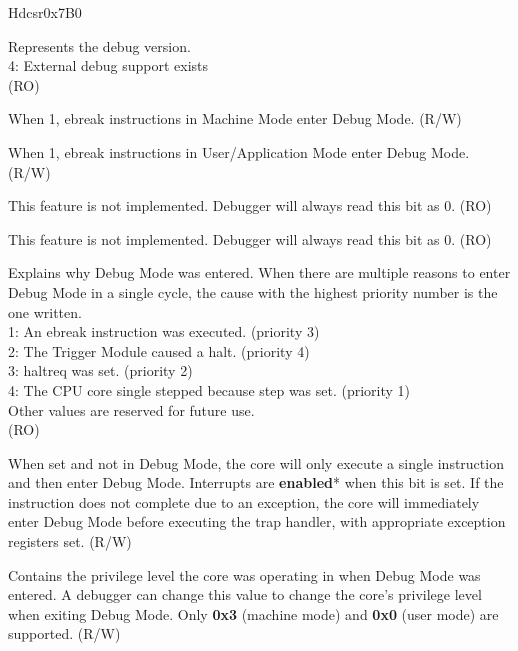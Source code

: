 
\begin{register}{H}{dcsr}{0x7B0}
\label{regdesc:DCSR}
%
%
%
%
%
%
%
%
%
%
%
%
\regnewline%
\begin{regdesc}
\begin{reglist}
\label{fielddesc:DCSRXEDBGVER}\item [xdebugver] Represents the debug version. \\
4: External debug support exists\\
(RO)
\label{fielddesc:DCSREBREAKM}\item [ebreakm] When 1, ebreak instructions in Machine Mode enter Debug Mode. (R/W)
\label{fielddesc:DCSREBREAKU}\item [ebreaku] When 1, ebreak instructions in User/Application Mode enter Debug Mode. (R/W)
\label{fielddesc:DCSRSTOPCOUNT}\item [stopcount] This feature is not implemented. Debugger will always read this bit as 0. (RO)
\label{fielddesc:DCSRSTOPTIME}\item [stoptime] This feature is not implemented. Debugger will always read this bit as 0. (RO)
\label{fielddesc:DCSRCAUSE}\item [cause] Explains why Debug Mode was entered. When there are multiple reasons to enter Debug Mode in a single cycle, the cause with the highest priority number is the one written.\\
1: An ebreak instruction was executed. (priority 3)\\
2: The Trigger Module caused a halt. (priority 4)\\
3: haltreq was set. (priority 2)\\
4: The CPU core single stepped because step was set. (priority 1)\\
Other values are reserved for future use.\\
(RO)
\label{fielddesc:DCSRSTEP}\item [step] When set and not in Debug Mode, the core will only execute a single instruction and then enter Debug Mode. Interrupts are \textbf{enabled}* when this bit is set. If the instruction does not complete due to an exception, the core will immediately enter Debug Mode before executing the trap handler, with appropriate exception registers set. (R/W)
\label{fielddesc:DCSRPRV}\item [prv] Contains the privilege level the core was operating in when Debug Mode was entered. A debugger can change this value to change the core's privilege level when exiting Debug Mode. Only \textbf{0x3} (machine mode) and \textbf{0x0} (user mode) are supported. (R/W)
\end{reglist}
\end{regdesc}
\end{register}

